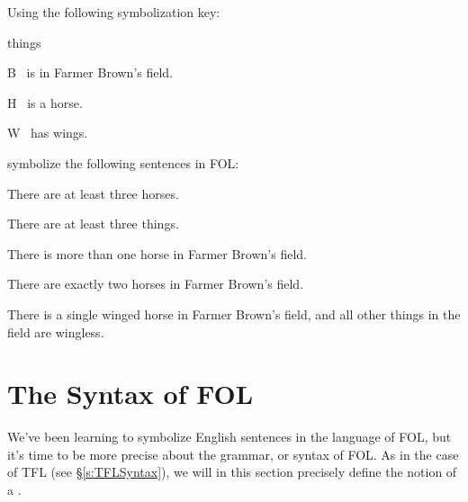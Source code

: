 \problempart Using the following symbolization key:
\begin{ekey}
\item[\text{domain}] things
\item[B] \blank\  is in Farmer Brown's field.
\item[H] \blank\  is a horse.
\item[W] \blank\  has wings.
\end{ekey}
symbolize the following sentences in FOL:
\begin{earg}
\item There are at least three horses.
\item There are at least three things.
\item There is more than one horse in Farmer Brown's field.
\item There are exactly two horses in Farmer Brown's field.
\item There is a single winged horse in Farmer Brown's field, and all other things in the field are wingless.
\end{earg}



\section{The Syntax of FOL}\label{s:FOLSyntax}

We've been learning to symbolize English sentences in the language of FOL, but it's time to be more precise about the grammar, or syntax of FOL.  As in the case of TFL (see \S\ref{s:TFLSyntax}), we will in this section precisely define the notion of a  .

